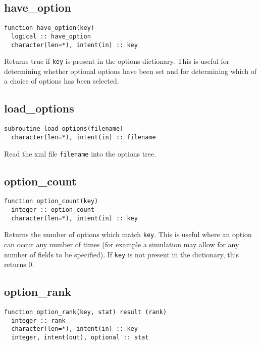 \documentclass[a4paper, 11pt]{book}
\begin{document}
\subsection{have\_option}

\begin{lstlisting}
function have_option(key)
  logical :: have_option
  character(len=*), intent(in) :: key
\end{lstlisting}

Returns true if \lstinline+key+ is present in the options
dictionary. This is useful for determining whether optional options have
been set and for determining which of a choice of options has been selected.

\subsection{load\_options}

\begin{lstlisting}
subroutine load_options(filename) 
  character(len=*), intent(in) :: filename
\end{lstlisting}

Read the xml file \lstinline+filename+ into the options tree.

\subsection{option\_count}

\begin{lstlisting}
function option_count(key)
  integer :: option_count
  character(len=*), intent(in) :: key
\end{lstlisting}

Returns the number of options which match \lstinline+key+. This is
useful where an option can occur any number of times (for example a
simulation may allow for any number of fields to be specified). If
\lstinline+key+ is not present in the dictionary, this returns 0.

\subsection{option\_rank}

\begin{lstlisting}
function option_rank(key, stat) result (rank)
  integer :: rank
  character(len=*), intent(in) :: key
  integer, intent(out), optional :: stat
\end{lstlisting}
\end{document}
